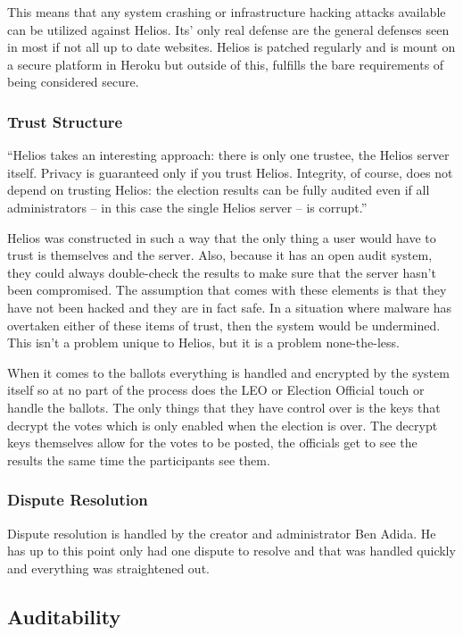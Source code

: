 This means that any system crashing or infrastructure hacking attacks
available can be utilized against Helios. Its' only real defense are
the general defenses seen in most if not all up to date
websites. Helios is patched regularly and is mount on a secure
platform in Heroku but outside of this, fulfills the bare requirements
of being considered secure.

\subsubsection{Trust Structure}

``Helios takes an interesting approach: there is only one trustee, the
Helios server itself. Privacy is guaranteed only if you trust
Helios. Integrity, of course, does not depend on trusting Helios: the
election results can be fully audited even if all administrators -- in
this case the single Helios server -- is corrupt.''~\cite{adida2008}

Helios was constructed in such a way that the only thing a user would
have to trust is themselves and the server. Also, because it has an
open audit system, they could always double-check the results to make
sure that the server hasn't been compromised. The assumption that
comes with these elements is that they have not been hacked and they
are in fact safe. In a situation where malware has overtaken either of
these items of trust, then the system would be undermined. This isn't
a problem unique to Helios, but it is a problem none-the-less.

When it comes to the ballots everything is handled and encrypted by
the system itself so at no part of the process does the LEO or
Election Official touch or handle the ballots. The only things that
they have control over is the keys that decrypt the votes which is
only enabled when the election is over. The decrypt keys themselves
allow for the votes to be posted, the officials get to see the results
the same time the participants see them.

\subsubsection{Dispute Resolution}

Dispute resolution is handled by the creator and administrator Ben
Adida. He has up to this point only had one dispute to resolve and
that was handled quickly and everything was straightened out.

\subsection{Auditability}

